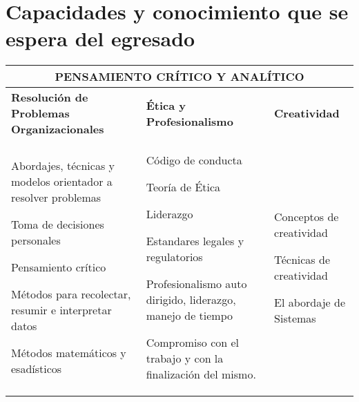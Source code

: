\section{Capacidades y conocimiento que se espera del egresado}\label{sec:IS-Capabilities-and-Knowledgement}

\newenvironment{capenv}{\begin{description}}{\end{description}}

\begin{center}
\begin{tabularx}{\textwidth}{|X|X|X|} \hline
\multicolumn{3}{|c|}{\textbf{PENSAMIENTO CRÍTICO Y ANALÍTICO}} \\ \hline
\textbf{Resolución de Problemas Organizacionales} & \textbf{Ética y Profesionalismo} & \textbf{Creatividad} \\ \hline
\begin{capenv}
\item Abordajes, técnicas y modelos orientador a resolver problemas
\item Toma de decisiones personales
\item Pensamiento crítico
\item Métodos para recolectar, resumir e interpretar datos
\item Métodos matemáticos y esadísticos
\end{capenv}
&
\begin{capenv}
\item Código de conducta
\item Teoría de Ética
\item Liderazgo
\item Estandares legales y regulatorios
\item Profesionalismo auto dirigido, liderazgo, manejo de tiempo
\item Compromiso con el trabajo y con la finalización del mismo.
\end{capenv}
&
\begin{capenv}
\item Conceptos de creatividad
\item Técnicas de creatividad
\item El abordaje de Sistemas
\end{capenv} \\ \hline

\end{tabularx}
\end{center}

